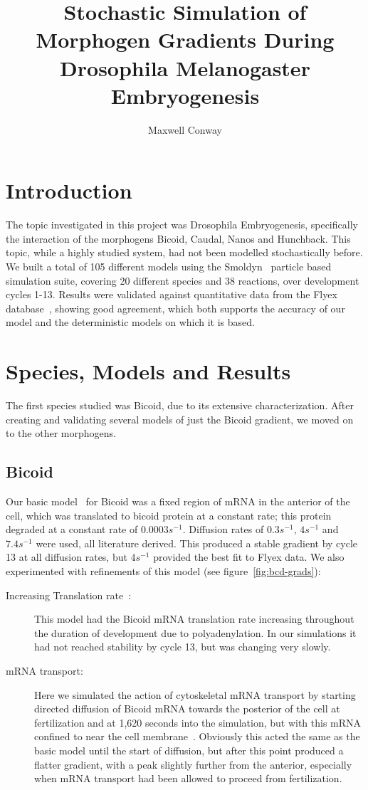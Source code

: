 \documentclass[11pt,a4paper,twocolumn]{article}
\begin{document}
\title{Stochastic Simulation of Morphogen Gradients During Drosophila Melanogaster Embryogenesis}
\author{Maxwell Conway}
\date{}
\maketitle
\section{Introduction}
The topic investigated in this project was Drosophila Embryogenesis, specifically the interaction of the morphogens Bicoid, Caudal, Nanos and Hunchback. This topic, while a highly studied system, had not been modelled stochastically before. We built a total of 105 different models using the Smoldyn~\cite{Andrews2010} particle based simulation suite, covering 20 different species and 38 reactions, over development cycles 1-13. Results were validated against quantitative data from the Flyex database~\cite{Pisarev2009}, showing good agreement, which both supports the accuracy of our model and the deterministic models on which it is based. 

\section{Species, Models and Results}
The first species studied was Bicoid, due to its extensive characterization. After creating and validating several models of just the Bicoid gradient, we moved on to the other morphogens.
\subsection{Bicoid}
Our basic model~\cite{Grimm2010} for Bicoid was a fixed region of mRNA in the anterior of the cell, which was translated to bicoid protein at a constant rate; this protein degraded at a constant rate of \(0.0003s^{-1}\). Diffusion rates of \(0.3s^{-1}\), \(4s^{-1}\) and \(7.4s^{-1}\) were used, all literature derived. This produced a stable gradient by cycle 13 at all diffusion rates, but  \(4s^{-1}\) provided the best fit to Flyex data.  We also experimented with refinements of this model (see figure~\ref{fig:bcd-grads}):
\begin{description}
\item[Increasing Translation rate~\cite{Holloway2011}:]
This model had the Bicoid mRNA translation rate increasing throughout the duration of development due to polyadenylation. In our simulations it had not reached stability by cycle 13, but was changing very slowly.
\item[mRNA transport:]
Here we simulated the action of cytoskeletal mRNA transport by starting directed diffusion of Bicoid mRNA towards the posterior of the cell at fertilization and at 1,620 seconds into the simulation, but with this mRNA confined to near the cell membrane~\cite{Spirov2009}. Obviously this acted the same as the basic model until the start of diffusion, but after this point produced a flatter gradient, with a peak slightly further from the anterior, especially when mRNA transport had been allowed to proceed from fertilization.
\end{description}
\end{document}

